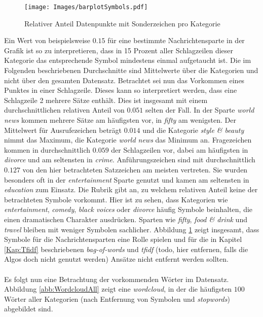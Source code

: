 \documentclass[a4paper,11pt]{article}
\begin{document}
\begin{figure}[ht]
    \centering
\texttt{[image: Images/barplotSymbols.pdf]} 
\label{abb:barplotSymbols}
\caption{Relativer Anteil Datenpunkte mit Sonderzeichen pro Kategorie}
\end{figure}

Ein Wert von beispielsweise $0.15$ für eine bestimmte Nachrichtensparte in der Grafik ist so zu interpretieren, dass in 15 Prozent aller Schlagzeilen dieser Kategorie das entsprechende Symbol mindestens einmal aufgetaucht ist. Die im Folgenden beschriebenen Durchschnitte sind Mittelwerte über die Kategorien und nicht über den gesamten Datensatz. Betrachtet sei nun das Vorkommen eines Punktes in einer Schlagzeile. Dieses kann so interpretiert werden, dass eine Schlagzeile 2
mehrere Sätze enthält. Dies ist insgesamt mit einem durchschnittlichen relativen Anteil von $0.051$ selten der Fall. In der Sparte \textit{world news} kommen mehrere Sätze am häufigsten vor, in \textit{fifty} am wenigsten. Der Mittelwert für Ausrufezeichen beträgt $0.014$ und die Kategorie \textit{style \& beauty} nimmt das Maximum, die Kategorie \textit{world news} das Minimum an. Fragezeichen kommen in durchschnittlich $0.059$ der Schlagzeilen vor, dabei am häufigsten in \textit{divorce} und am seltensten in \textit{crime}. Anführungszeichen sind mit durchschnittlich $0.127$ von den hier betrachteten Satzzeichen am meisten vertreten. Sie wurden besonders oft in der \textit{entertainment} Sparte genutzt und kamen am seltensten in \textit{education} zum Einsatz. Die Rubrik  gibt an, zu welchem relativen Anteil keine der betrachteten Symbole vorkommt. Hier ist zu sehen, dass Kategorien wie \textit{entertainment}, \textit{comedy}, \textit{black voices} oder \textit{divorce} häufig Symbole beinhalten, die einen dramatischen Charakter ausdrücken. Sparten wie \textit{fifty}, \textit{food \& drink} und \textit{travel} bleiben mit weniger Symbolen sachlicher. Abbildung \ref{abb:barplotSymbols} zeigt insgesamt, dass Symbole für die Nachrichtensparten eine Rolle spielen und für die in Kapitel \ref{Kap:Tfidf} beschriebenen \textit{bag-of-words} und \textit{tfidf} (todo, hier entfernen, falls die Algos doch nicht genutzt werden) Ansätze nicht entfernt werden sollten.\\
\\
Es folgt nun eine Betrachtung der vorkommenden Wörter im Datensatz. Abbildung \ref{abb:WordcloudAll} zeigt eine \textit{wordcloud}, in der die häufigsten $100$ Wörter aller Kategorien (nach Entfernung von Symbolen und \textit{stopwords}) abgebildet sind.
\end{document}
